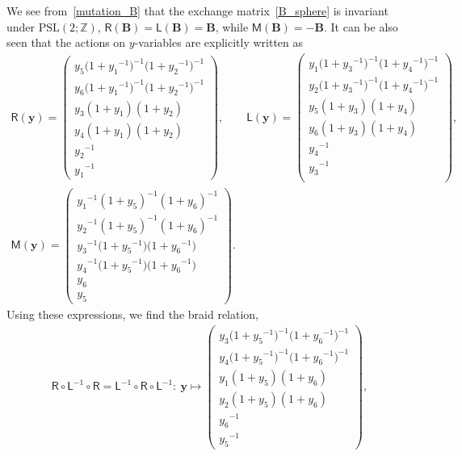 \documentclass[10pt,a4paper]{amsart}
\numberwithin{equation}{section}
\begin{document}
We see from~\eqref{mutation_B} that the exchange matrix~\eqref{B_sphere} is invariant under $\mathrm{PSL}(2;\mathbb{Z})$, $\mathsf{R}(\mathbf{B})=\mathsf{L}(\mathbf{B})=\mathbf{B}$, while $\mathsf{M}(\mathbf{B})=-\mathbf{B}$. It can be also seen that the actions on $y$-variables are explicitly written as
 \begin{gather*}%
 \mathsf{R}(\boldsymbol{y}) =
 \begin{pmatrix}
 y_5 \big( 1+ {y_1}^{-1} \big)^{-1}
 \big( 1+{y_2}^{-1} \big)^{-1} \\
 y_6 \big( 1+ {y_1}^{-1} \big)^{-1}
 \big( 1+{y_2}^{-1} \big)^{-1} \\
 y_3 ( 1+y_1 ) ( 1+y_2 ) \\
 y_4 ( 1+y_1 ) ( 1+y_2 ) \\
 {y_2}^{-1} \\
 {y_1}^{-1}
 \end{pmatrix} , \qquad
 \mathsf{L}(\boldsymbol{y}) =
 \begin{pmatrix}
 y_1 \big( 1+ {y_3}^{-1} \big)^{-1}
 \big( 1+{y_4}^{-1} \big)^{-1} \\
 y_2 \big( 1+ {y_3}^{-1} \big)^{-1}
 \big( 1+{y_4}^{-1} \big)^{-1} \\
 y_5 ( 1+y_3 ) ( 1+y_4 ) \\
 y_6 ( 1+y_3 ) ( 1+y_4 ) \\
 {y_4}^{-1} \\
 {y_3}^{-1} \\
 \end{pmatrix} , \\
 \mathsf{M}(\boldsymbol{y}) =
 \begin{pmatrix}
 {y_1}^{-1} ( 1+y_5 )^{-1} ( 1+y_6 )^{-1} \\
 {y_2}^{-1} ( 1+y_5 )^{-1} ( 1+y_6 )^{-1} \\
 {y_3}^{-1} \big( 1+{y_5}^{-1} \big) \big( 1+{y_6}^{-1} \big) \\
 {y_4}^{-1} \big( 1+{y_5}^{-1} \big) \big(1+{y_6}^{-1} \big) \\
 y_6 \\
 y_5
 \end{pmatrix} .
 \end{gather*}
 Using these expressions, we find the braid relation,
 \begin{gather*}
 \mathsf{R} \circ \mathsf{L}^{-1} \circ \mathsf{R} = \mathsf{L}^{-1} \circ \mathsf{R} \circ \mathsf{L}^{-1}\colon \
 \boldsymbol{y}
 \mapsto
 \begin{pmatrix}
 y_3 \big( 1+{y_5}^{-1} \big)^{-1} \big( 1+{y_6}^{-1} \big)^{-1} \\
 y_4 \big( 1+{y_5}^{-1} \big)^{-1} \big( 1+{y_6}^{-1} \big)^{-1} \\
 y_1 ( 1+y_5 ) ( 1+y_6 ) \\
 y_2 ( 1+y_5 ) ( 1+y_6 ) \\
 {y_6}^{-1} \\
 {y_5}^{-1}
 \end{pmatrix} ,
 \end{gather*}
\end{document}
